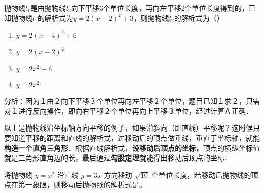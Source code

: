 \begin{example}抛物线\( l_1 \)是由抛物线\( l_2 \)向下平移3个单位长度，再向左平移2个单位长度得到的，已知抛物线\( l_1 \)的解析式为\( y=2(x-2)^2+3 \)，则抛物线\( l_2 \)的解析式为（\hspace{3.5em}）

\begin{enumerate}[label=\Alph*.]
    \item \( y=2(x-4)^2+6 \)
    \item \( y=2(x-2)^2 \)
    \item \( y=2x^2+6 \)
    \item \( y=2x^2 \)
\end{enumerate}
\end{example}
\begin{solution}
    分析：因为１由２向下平移３个单位再向左平移２个单位，题目已知１求２，只需对１进行反向操作，即向右平移２个单位再向上平移３单位，经过计算Ａ正确．
\end{solution}
以上是抛物线沿坐标轴方向平移的例子，如果沿斜向（即直线）平移呢？这时候只要知道平移的距离和直线的解析式，过移动后的顶点做垂线，垂直于坐标轴，就能\textbf{构造一个直角三角形}．根据直线解析式，\textbf{设移动后顶点的坐标}，顶点的横纵坐标值就是三角形直角边的长，最后通过\textbf{勾股定理}就能得出移动后顶点的坐标．
\begin{example}
    将抛物线 \( y = x^2 \) 沿直线 \( y = 3x \) 方向移动 \(\sqrt{10}\) 个单位长度，若移动后抛物线的顶点在第一象限，则移动后抛物线的解析式是\underline{\hspace{4em}}。
\end{example}
